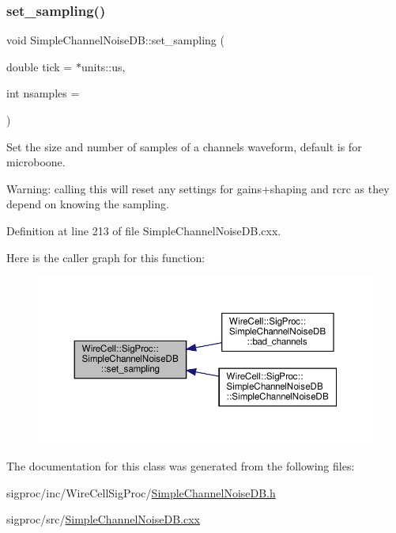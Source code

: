 \subsubsection{\texorpdfstring{set\+\_\+sampling()}{set\_sampling()}}
{\footnotesize\ttfamily void Simple\+Channel\+Noise\+D\+B\+::set\+\_\+sampling (\begin{DoxyParamCaption}\item[{double}]{tick = {$\ast$units\+:\+:us},  }\item[{int}]{nsamples = {} }\end{DoxyParamCaption})}

Set the size and number of samples of a channel\textquotesingle{}s waveform, default is for microboone.

Warning\+: calling this will reset any settings for gains+shaping and rcrc as they depend on knowing the sampling. 

Definition at line 213 of file Simple\+Channel\+Noise\+D\+B.\+cxx.

Here is the caller graph for this function\+:
\nopagebreak
\begin{figure}[H]
\begin{center}
\leavevmode
\includegraphics[width=350pt]{class_wire_cell_1_1_sig_proc_1_1_simple_channel_noise_d_b_a9ede3bdc966580756f9fff4070e8348b_icgraph}
\end{center}
\end{figure}


The documentation for this class was generated from the following files\+:\begin{DoxyCompactItemize}
\item 
sigproc/inc/\+Wire\+Cell\+Sig\+Proc/\hyperlink{_simple_channel_noise_d_b_8h}{Simple\+Channel\+Noise\+D\+B.\+h}\item 
sigproc/src/\hyperlink{_simple_channel_noise_d_b_8cxx}{Simple\+Channel\+Noise\+D\+B.\+cxx}\end{DoxyCompactItemize}

